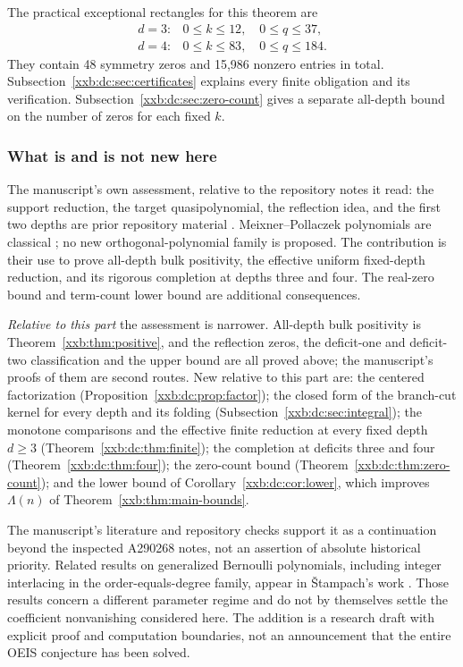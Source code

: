 \documentclass[11pt,a4paper]{article}
\numberwithin{equation}{section}
\theoremstyle{definition}
\theoremstyle{remark}
\theoremstyle{plain}
\begin{document}
The practical exceptional rectangles for this theorem are
\begin{equation}\label{xxb:dc:eq:rectangles}
 \begin{array}{ll}
 d=3:&0\le k\le12,\quad0\le q\le37,\\
 d=4:&0\le k\le83,\quad0\le q\le184.
 \end{array}
\end{equation}
They contain 48 symmetry zeros and 15,986 nonzero entries in total.
Subsection~\ref{xxb:dc:sec:certificates} explains every finite obligation and
its verification.  Subsection~\ref{xxb:dc:sec:zero-count} gives a separate
all-depth bound on the number of zeros for each fixed $k$.

\subsubsection{What is and is not new here}

The manuscript's own assessment, relative to the repository notes it read:
the support reduction, the target quasipolynomial, the reflection idea, and
the first two depths are prior repository material \cite{xxbdc-notes}.
Meixner--Pollaczek polynomials are classical \cite{xxbdc-dlmf}; no new
orthogonal-polynomial family is proposed.  The contribution is their use to
prove all-depth bulk positivity, the effective uniform fixed-depth reduction,
and its rigorous completion at depths three and four.  The real-zero bound and
term-count lower bound are additional consequences.

\emph{Relative to this part} the assessment is narrower.  All-depth bulk
positivity is Theorem~\ref{xxb:thm:positive}, and the reflection zeros, the
deficit-one and deficit-two classification and the upper bound are all proved
above; the manuscript's proofs of them are second routes.  New relative to this
part are: the centered factorization (Proposition~\ref{xxb:dc:prop:factor}); the
closed form of the branch-cut kernel for every depth and its folding
(Subsection~\ref{xxb:dc:sec:integral}); the monotone comparisons and the
effective finite reduction at every fixed depth $d\ge3$
(Theorem~\ref{xxb:dc:thm:finite}); the completion at deficits three and four
(Theorem~\ref{xxb:dc:thm:four}); the zero-count bound
(Theorem~\ref{xxb:dc:thm:zero-count}); and the lower bound of
Corollary~\ref{xxb:dc:cor:lower}, which improves $\Lambda(n)$ of
Theorem~\ref{xxb:thm:main-bounds}.

The manuscript's literature and repository checks support it as a continuation
beyond the inspected A290268 notes, not an assertion of absolute historical
priority.  Related results on generalized Bernoulli polynomials, including
integer interlacing in the order-equals-degree family, appear in
\v{S}tampach's work \cite{xxbdc-stampach}.  Those results concern a different
parameter regime and do not by themselves settle the coefficient nonvanishing
considered here.  The addition is a research draft with explicit proof and
computation boundaries, not an announcement that the entire OEIS conjecture has
been solved.
\end{document}
